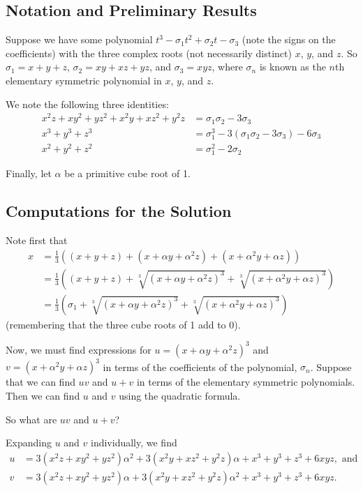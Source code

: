 \documentclass[a4paper,10pt,titlepage]{article}
\theoremstyle{definition}
\begin{document}
\subsection*{Notation and Preliminary Results}
Suppose we have some polynomial $ t^3 - \sigma_1 t^2 + \sigma_2 t - \sigma_3 $ (note the signs
on the coefficients) with the three complex roots (not necessarily distinct) $ x $, $ y $,
and $ z $. So $ \sigma_1 = x + y + z $, $ \sigma_2 = xy + xz + yz $, and $ \sigma_3 = xyz $,
where $ \sigma_n $ is known as the $ n$th elementary symmetric polynomial in $ x $, $ y $, and $ z $.

We note the following three identities:
\begin{align*}
  x^2z + xy^2 + yz^2 + x^2y + xz^2 + y^2z &= \sigma_1\sigma_2 - 3\sigma_3\\
  x^3 + y^3 + z^3 &= \sigma_1^3 - 3(\sigma_1\sigma_2 - 3\sigma_3) - 6\sigma_3\\
  x^2 + y^2 + z^2 &= \sigma_1^2 - 2\sigma_2
\end{align*}

Finally, let $ \alpha $ be a primitive cube root of 1.

\subsection*{Computations for the Solution}
Note first that
\begin{align*}
  x &= \frac{1}{3}\left( (x + y + z) + (x + \alpha y + \alpha^2 z) + (x + \alpha^2 y + \alpha z) \right)\\
    &= \frac{1}{3}\left( (x + y + z) + \sqrt[3]{(x + \alpha y + \alpha^2 z)^3} + \sqrt[3]{(x + \alpha^2 y + \alpha z)^3} \right)\\
    &= \frac{1}{3}\left( \sigma_1 + \sqrt[3]{(x + \alpha y + \alpha^2 z)^3} + \sqrt[3]{(x + \alpha^2 y + \alpha z)^3} \right)
\end{align*}
(remembering that the three cube roots of 1 add to 0).

Now, we must find expressions for $ u = (x + \alpha y + \alpha^2 z)^3 $ and $ v = (x + \alpha^2 y + \alpha z)^3 $ in terms of
the coefficients of the polynomial, $ \sigma_n $. Suppose that we can find $ uv $ and $ u + v $ in terms of the elementary
symmetric polynomials. Then we can find $ u $ and $ v $ using the quadratic formula.

So what are $ uv $ and $ u + v $?

Expanding $ u $ and $ v $ individually, we find
\begin{align*}
  u &= 3(x^2z + xy^2 + yz^2)\alpha^2 + 3(x^2y + xz^2 + y^2z)\alpha + x^3 + y^3 + z^3 + 6xyz, \text{ and}\\
  v &= 3(x^2z + xy^2 + yz^2)\alpha + 3(x^2y + xz^2 + y^2z)\alpha^2 + x^3 + y^3 + z^3 + 6xyz.
\end{align*}
\end{document}
